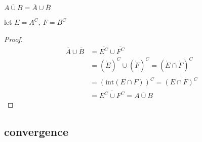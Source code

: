 \documentclass[11pt,a4paper]{book}
\begin{document}
\begin{lem}
    $\overline{A \cup B} = \overline{A} \cup \overline{B}$
\end{lem}

let $E = A^C,\: F = B^C$

\begin{proof}
    \begin{align*}
        \overline{A} \cup \overline{B} &= \overline{E^C} \cup \overline{F^C} \\
        &= (\mathring{E})^C \cup (\mathring{F})^C 
        = (\mathring{E} \cap \mathring{F})^C \\
        &= (\text{int}(E \cap F))^C 
        = \overline{(E \cap F)^C} \\
        &= \overline{E^C \cup F^C} = \overline{A \cup B}
    \end{align*}
\end{proof}



\subsection{convergence}
\end{document}
